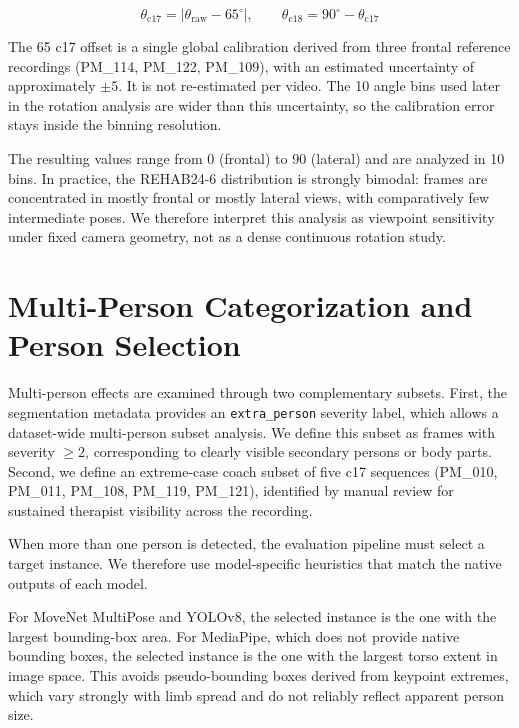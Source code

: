 \begin{equation}
  \theta_{\text{c17}} = |\theta_{\text{raw}} - 65^{\circ}|, \qquad
  \theta_{\text{c18}} = 90^{\circ} - \theta_{\text{c17}}
  \label{eq:rotation-cam}
\end{equation}

The 65\textdegree{} c17 offset is a single global calibration derived from three frontal reference recordings (PM\_114, PM\_122, PM\_109), with an estimated uncertainty of approximately $\pm 5$\textdegree{}. It is not re-estimated per video. The 10\textdegree{} angle bins used later in the rotation analysis are wider than this uncertainty, so the calibration error stays inside the binning resolution.

The resulting values range from 0\textdegree{} (frontal) to 90\textdegree{} (lateral) and are analyzed in 10\textdegree{} bins. In practice, the REHAB24-6 distribution is strongly bimodal: frames are concentrated in mostly frontal or mostly lateral views, with comparatively few intermediate poses. We therefore interpret this analysis as viewpoint sensitivity under fixed camera geometry, not as a dense continuous rotation study.

\section{Multi-Person Categorization and Person Selection}
\label{sec:person-selection}

Multi-person effects are examined through two complementary subsets. First, the segmentation metadata provides an \texttt{extra\_person} severity label, which allows a dataset-wide multi-person subset analysis. We define this subset as frames with severity $\geq 2$, corresponding to clearly visible secondary persons or body parts. Second, we define an extreme-case coach subset of five c17 sequences (PM\_010, PM\_011, PM\_108, PM\_119, PM\_121), identified by manual review for sustained therapist visibility across the recording.

When more than one person is detected, the evaluation pipeline must select a target instance. We therefore use model-specific heuristics that match the native outputs of each model.

For MoveNet MultiPose and YOLOv8, the selected instance is the one with the largest bounding-box area. For MediaPipe, which does not provide native bounding boxes, the selected instance is the one with the largest torso extent in image space. This avoids pseudo-bounding boxes derived from keypoint extremes, which vary strongly with limb spread and do not reliably reflect apparent person size.

